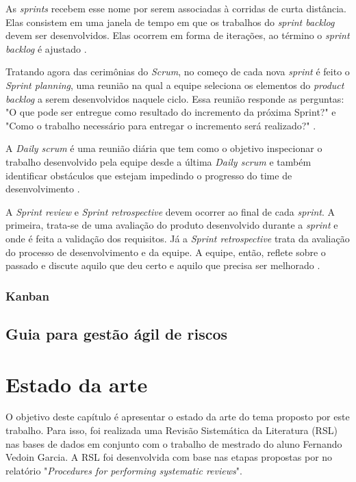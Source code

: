 \documentclass[
    12pt,       %
    openright,      %
    twoside,      %
    a4paper,      %
    english,      %
    french,       %
    spanish,      %
    brazil,       %
    ]{abntex2}
\begin{document}
As \textit{sprints} recebem esse nome por serem associadas à corridas de curta distância. Elas consistem em uma janela de tempo em que os trabalhos do \textit{sprint backlog} devem ser desenvolvidos. Elas ocorrem em forma de iterações, ao término o \textit{sprint backlog} é ajustado \cite{PRESSMAN:2011}.

Tratando agora das cerimônias do \textit{Scrum}, no começo de cada nova \textit{sprint} é feito o \textit{Sprint planning}, uma reunião na qual a equipe seleciona os elementos do \textit{product backlog} a serem desenvolvidos naquele ciclo. Essa reunião responde as perguntas: "O que pode ser entregue como resultado do incremento da próxima Sprint?" e "Como o trabalho necessário para entregar o incremento será realizado?" \cite{Sutherland:2013}.

A \textit{Daily scrum} é uma reunião diária que tem como o objetivo inspecionar o trabalho desenvolvido pela equipe desde a última \textit{Daily scrum} e também identificar obstáculos que estejam impedindo o progresso do time de desenvolvimento \cite{Sutherland:2013}. 

A \textit{Sprint review} e \textit{Sprint retrospective} devem ocorrer ao final de cada \textit{sprint}. A primeira, trata-se de uma avaliação do produto desenvolvido durante a \textit{sprint} e onde é feita a validação dos requisitos. Já a \textit{Sprint retrospective} trata da avaliação do processo de desenvolvimento e da equipe. A equipe, então, reflete sobre o passado e discute aquilo que deu certo e aquilo que precisa ser melhorado \cite{WAZLAWICK:2013}.

\subsection{Kanban}

\section{Guia para gestão ágil de riscos}


\chapter{Estado da arte}
\label{sec:EstadoArte}

O objetivo deste capítulo é apresentar o estado da arte do tema proposto por este trabalho. Para isso, foi realizada uma Revisão Sistemática da Literatura (RSL) nas bases de dados em conjunto com o trabalho de mestrado do aluno Fernando Vedoin Garcia. A RSL foi desenvolvida com base nas etapas propostas por  no relatório "\textit{Procedures for performing systematic reviews}". 
\end{document}
